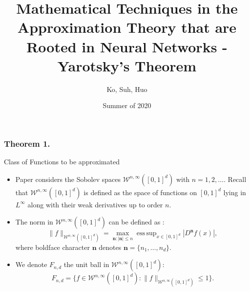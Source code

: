 \documentclass{if-beamer}
\title[Neural Networks in Approximation]{Mathematical Techniques in the Approximation Theory that are Rooted in Neural Networks - Yarotsky's Theorem}
\author{Ko, Suh, Huo}
\institute{Georgia Tech}
\date{Summer of 2020}
\DeclareMathOperator*{\esssup}{ess\,sup}
\begin{document}
\begin{frame}
  \titlepage
\end{frame}

\subsubsection{Theorem 1.}
\begin{frame}{Class of Functions to be approximated}
\begin{itemize}
    \item Paper considers the Sobolev spaces $\mathcal{W}^{n,\infty}([0,1]^{d})$ with $n=1,2,\dots$. Recall that $\mathcal{W}^{n,\infty}([0,1]^{d})$ is defined as the space of functions on $[0,1]^{d}$ lying in $L^{\infty}$ along with their weak derivatives up to order $n$.
    \item The norm in $\mathcal{W}^{n,\infty}([0,1]^{d})$ can be defined as :
    \begin{equation*}
        \|f\|_{\mathcal{W}^{n,\infty}([0,1]^{d})} = \max_{\textbf{n}:|\textbf{n}|\leq n}\esssup_{x\in[0,1]^{d}}\left| D^{\textbf{n}}f(x) \right|,
    \end{equation*}
    where boldface character $\textbf{n}$ denotes $\textbf{n}=\{n_{1},\dots,n_{d}\}$.
    \item We denote $F_{n,d}$ the unit ball in $\mathcal{W}^{n,\infty}([0,1]^{d})$:
    \begin{equation*}
        F_{n,d} = \{f\in\mathcal{W}^{n,\infty}([0,1]^{d}):\|f\|_{\mathcal{W}^{n,\infty}([0,1]^{d})}\leq 1\}.
    \end{equation*}
\end{itemize}
\end{frame}
\end{document}
